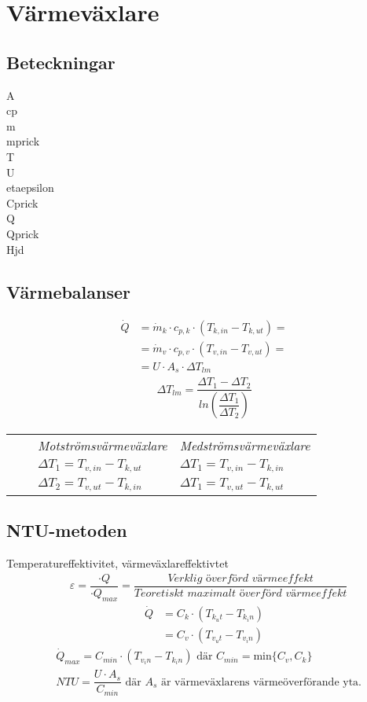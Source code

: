 \chapter{Värmeväxlare}
\section*{Beteckningar}

\acrfull{A} \\
\acrfull{cp} \\
\acrfull{m} \\
\acrfull{mprick} \\
\acrfull{T} \\
\acrfull{U} \\
\acrfull{etaepsilon} \\
\acrfull{Cprick} \\
\acrfull{Q} \\
\acrfull{Qprick} \\
\acrfull{Hjd}

\section*{Värmebalanser}
	\begin{align*}
		\dot{Q}&=\dot{m}_k\cdot c_{p,k}\cdot (T_{k,in}-T_{k,ut}) = \\
		       &=\dot{m}_v\cdot c_{p,v}\cdot (T_{v,in}-T_{v,ut}) = \\
		       &=U \cdot A_s \cdot \Delta T_{lm} 
	\end{align*}
	\begin{align*}
	\Delta T_{lm} = \dfrac{\Delta T_1 - \Delta T_2}{ln \left( \dfrac{\Delta T_1}{\Delta T_2}\right)}
	\end{align*}
	\begin{tabular}{l l l l}
    &&\textit{Motströmsvärmeväxlare} & \textit{Medströmsvärmeväxlare} \\
    &&$\Delta T_1 = T_{v,in} - T_{k,ut}$ & $\Delta T_1 = T_{v,in} - T_{k,in}$ \\
    &&$\Delta T_2 = T_{v,ut} - T_{k,in}$ & $\Delta T_1 = T_{v,ut} - T_{k,ut}$ \\
	\end{tabular}
	\section*{NTU-metoden}
	Temperatureffektivitet, värmeväxlareffektivtet
	\begin{align*}
		&\varepsilon = \dfrac{\cdot{Q}}{\cdot{Q}_{max}}=\dfrac{\textit{Verklig överförd värmeeffekt}}{\textit{Teoretiskt maximalt överförd värmeeffekt}}
	\end{align*}
	\begin{align*}
		\dot{Q}&=C_k \cdot (T_{k_ut} - T_{k_in}) \\
		       &=C_v \cdot (T_{v_ut} - T_{v_in})
	\end{align*}
	\begin{align*}
	&\dot{Q}_{max}=C_{min} \cdot (T_{v_in} - T_{k_in}) \text{ där } C_{min} = \text{min} \{C_v, C_k\} \\
	&\textit{NTU}=\dfrac{U \cdot A_s}{C_{min}} \text{ där } A_s \text{ är värmeväxlarens värmeöverförande yta.}
	\end{align*}
